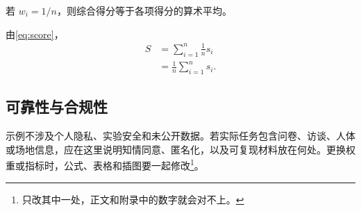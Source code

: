 \begin{thm}
若 $w_i = 1/n$，则综合得分等于各项得分的算术平均。
\end{thm}
\begin{pf}
由\eqref{eq:score}，
\begin{align}
  S &= \sum_{i=1}^{n} \frac{1}{n} s_i \label{eq:mean}\\
    &= \frac{1}{n}\sum_{i=1}^{n} s_i. \nonumber
\end{align}
\end{pf}

\subsection{可靠性与合规性}
示例不涉及个人隐私、实验安全和未公开数据。若实际任务包含问卷、访谈、人体或场地信息，应在这里说明知情同意、匿名化，以及可复现材料放在何处。更换权重或指标时，公式、表格和插图要一起修改\footnote{只改其中一处，正文和附录中的数字就会对不上。}。
